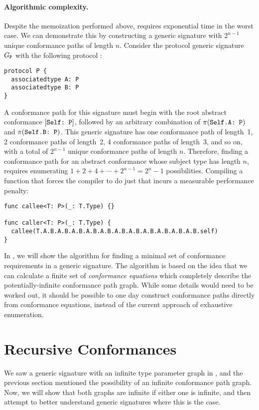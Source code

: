 \documentclass[../generics]{subfiles}
\begin{document}
\paragraph{Algorithmic complexity.}
Despite the memoization performed above,  requires exponential time in the worst case. We can demonstrate this by constructing a generic signature with $2^{n-1}$ unique conformance paths of length $n$. Consider the protocol generic signature $G_{\texttt{P}}$ with the following protocol \tP:
\begin{Verbatim}
protocol P {
  associatedtype A: P
  associatedtype B: P
}
\end{Verbatim}

A conformance path for this signature must begin with the root abstract conformance $[\texttt{Self:~P}]$, followed by an arbitrary combination of $\pi(\texttt{Self.A:~P})$ and $\pi(\texttt{Self.B:~P})$. This generic signature has one conformance path of length~1, 2 conformance paths of length~2, 4 conformance paths of length~3, and so on, with a total of $2^{n-1}$ unique conformance paths of length $n$. Therefore, finding a conformance path for an abstract conformance whose subject type has length $n$, requires enumerating $1+2+4+\cdots+2^{n-1}=2^n-1$ possibilities. Compiling a function that forces the compiler to do just that incurs a measurable performance penalty:
\begin{Verbatim}
func callee<T: P>(_: T.Type) {}

func caller<T: P>(_: T.Type) {
  callee(T.A.B.A.B.A.B.A.B.A.B.A.B.A.B.A.B.A.B.A.B.A.B.self)
}
\end{Verbatim}

In , we will show the algorithm for finding a minimal set of conformance requirements in a generic signature. The algorithm is based on the idea that we can calculate a finite set of \emph{conformance equations} which completely describe the potentially-infinite conformance path graph. While some details would need to be worked out, it should be possible to one day construct conformance paths directly from conformance equations, instead of the current approach of exhaustive enumeration.

\section{Recursive Conformances}\label{recursive conformances}

We saw a generic signature with an infinite type parameter graph in , and the previous section mentioned the possibility of an infinite conformance path graph. Now, we will show that both graphs are infinite if either one is infinite, and then attempt to better understand generic signatures where this is the case.
\end{document}
